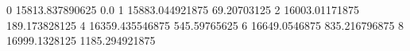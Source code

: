 0 15813.837890625 0.0
1 15883.044921875 69.20703125
2 16003.01171875 189.173828125
4 16359.435546875 545.59765625
6 16649.0546875 835.216796875
8 16999.1328125 1185.294921875

